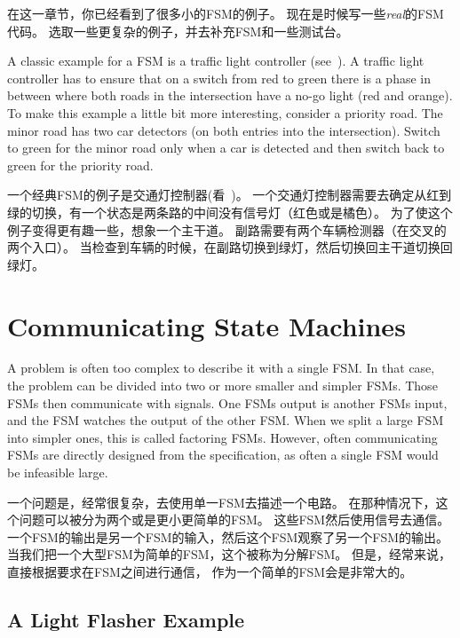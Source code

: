 \documentclass[%
    10pt,
    headinclude, footexclude,
    openright, %
    notitlepage,
    cleardoubleempty,
    headsepline,
    pointlessnumbers,
    bibtotoc, idxtotoc,
    ]{scrbook}
\newcommand{\todo}[1]{{\emph{TODO: #1}}}
\renewcommand{\todo}[1]{}
\begin{document}
在这一章节，你已经看到了很多小的FSM的例子。
现在是时候写一些\emph{real}的FSM代码。
选取一些更复杂的例子，并去补充FSM和一些测试台。

A classic example for a FSM is a traffic light controller (see~\cite[Section~14.3]{dally:vhdl:2016}).
A traffic light controller has to ensure that on a switch from red to green
there is a phase in between where both roads in the intersection
have a no-go light (red and orange).
To make this example a little bit more interesting, consider a priority road.
The minor road has two car detectors (on both entries into the intersection).
Switch to green for the minor road only when a car is detected and then switch
back to green for the priority road.

一个经典FSM的例子是交通灯控制器(看~\cite[Section~14.3]{dally:vhdl:2016})。
一个交通灯控制器需要去确定从红到绿的切换，有一个状态是两条路的中间没有信号灯（红色或是橘色）。
为了使这个例子变得更有趣一些，想象一个主干道。
副路需要有两个车辆检测器（在交叉的两个入口）。
当检查到车辆的时候，在副路切换到绿灯，然后切换回主干道切换回绿灯。

\todo{Luca: Greatest common divisor with Euclide algorithm can be also a nice exercise.
Martin: but this is shown at the Chisel homepage without an FSM.}

\chapter{Communicating State Machines}

A problem is often too complex to describe it with a single FSM.
In that case, the problem can be divided into two or more smaller and simpler FSMs.
Those FSMs then communicate with signals. One FSMs output is
another FSMs input, and the FSM watches the output of the other FSM.
When we split a large FSM into simpler ones, this is called factoring FSMs.
However, often communicating FSMs are directly designed from the specification,
as often a single FSM would be infeasible large.

一个问题是，经常很复杂，去使用单一FSM去描述一个电路。
在那种情况下，这个问题可以被分为两个或是更小更简单的FSM。
这些FSM然后使用信号去通信。
一个FSM的输出是另一个FSM的输入，然后这个FSM观察了另一个FSM的输出。
当我们把一个大型FSM为简单的FSM，这个被称为分解FSM。
但是，经常来说，直接根据要求在FSM之间进行通信，
作为一个简单的FSM会是非常大的。

\section{A Light Flasher Example}
\end{document}
